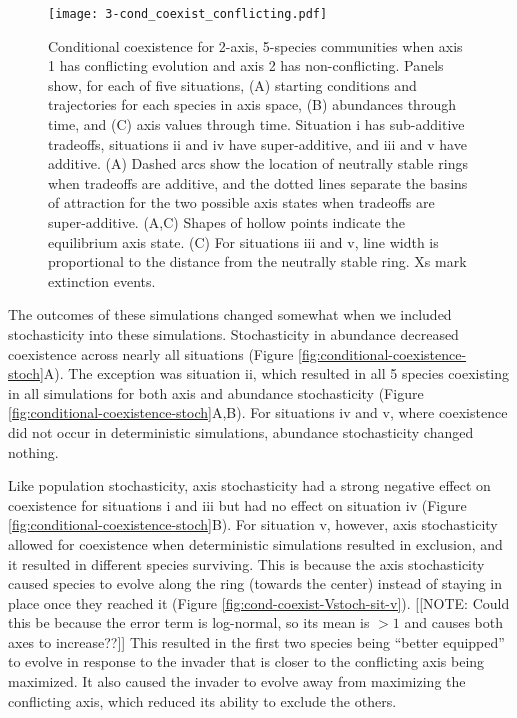 \begin{figure}[ht!]
\centering
\texttt{[image: 3-cond\_coexist\_conflicting.pdf]}
\caption{Conditional coexistence for 2-axis, 5-species communities when axis 1 has 
    conflicting evolution and axis 2 has non-conflicting.
    Panels show, for each of five situations,
    (A) starting conditions and trajectories for each species in axis space, 
    (B) abundances through time, and 
    (C) axis values through time.
    Situation i has sub-additive tradeoffs, situations ii and iv have 
    super-additive, and iii and v have additive.
    (A) Dashed arcs show the location of neutrally stable rings
    when tradeoffs are additive, and 
    the dotted lines separate the basins of attraction for the two possible
    axis states when tradeoffs are super-additive.
    (A,C) Shapes of hollow points indicate the equilibrium axis state.
    (C) For situations iii and v, line width is proportional to the 
    distance from the neutrally stable ring.
    Xs mark extinction events.
}
\label{fig:conditional-coexistence}
\end{figure}


The outcomes of these simulations changed somewhat when we included stochasticity
into these simulations.
Stochasticity in abundance decreased coexistence across nearly all situations
(Figure \ref{fig:conditional-coexistence-stoch}A).
The exception was situation ii, which resulted in all 5 species coexisting 
in all simulations for both axis and abundance stochasticity
(Figure \ref{fig:conditional-coexistence-stoch}A,B).
For situations iv and v, where coexistence did not occur in deterministic
simulations, abundance stochasticity changed nothing.

Like population stochasticity, axis stochasticity had a strong negative 
effect on coexistence for situations i and iii but had no effect on
situation iv (Figure \ref{fig:conditional-coexistence-stoch}B).
For situation v, however, axis stochasticity allowed for coexistence
when deterministic simulations resulted in exclusion, 
and it resulted in different species surviving.
This is because the axis stochasticity caused species to evolve 
along the ring (towards the center) instead of staying in place once they 
reached it (Figure \ref{fig:cond-coexist-Vstoch-sit-v}).
[[NOTE: Could this be because the error term is log-normal, so its mean is
$> 1$ and causes both axes to increase??]]
This resulted in the first two species being ``better equipped'' to evolve in 
response to the invader that is closer to the conflicting axis being
maximized.
It also caused the invader to evolve away from maximizing the conflicting
axis, which reduced its ability to exclude the others.



